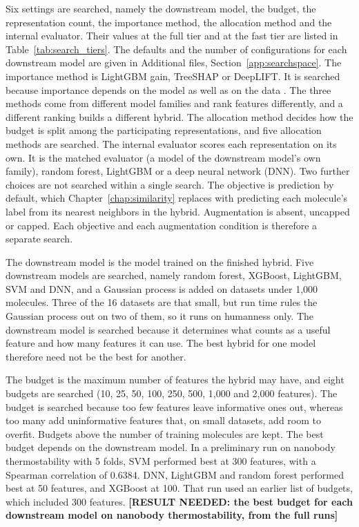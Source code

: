 Six settings are searched, namely the downstream model, the budget, the representation count, the importance method, the allocation method and the internal evaluator. Their values at the full tier and at the fast tier are listed in Table~\ref{tab:search_tiers}. The defaults and the number of configurations for each downstream model are given in Additional files, Section~\ref{app:searchspace}. The importance method is LightGBM gain, TreeSHAP or DeepLIFT. It is searched because importance depends on the model as well as on the data \citep{Dong2020}. The three methods come from different model families and rank features differently, and a different ranking builds a different hybrid. The allocation method decides how the budget is split among the participating representations, and five allocation methods are searched. The internal evaluator scores each representation on its own. It is the matched evaluator (a model of the downstream model's own family), random forest, LightGBM or a deep neural network (DNN). Two further choices are not searched within a single search. The objective is prediction by default, which Chapter~\ref{chap:similarity} replaces with predicting each molecule's label from its nearest neighbors in the hybrid. Augmentation is absent, uncapped or capped. Each objective and each augmentation condition is therefore a separate search.

The downstream model is the model trained on the finished hybrid. Five downstream models are searched, namely random forest, XGBoost, LightGBM, SVM and DNN, and a Gaussian process is added on datasets under 1,000 molecules. Three of the 16 datasets are that small, but run time rules the Gaussian process out on two of them, so it runs on humanness only. The downstream model is searched because it determines what counts as a useful feature and how many features it can use. The best hybrid for one model therefore need not be the best for another.

The budget is the maximum number of features the hybrid may have, and eight budgets are searched (10, 25, 50, 100, 250, 500, 1,000 and 2,000 features). The budget is searched because too few features leave informative ones out, whereas too many add uninformative features that, on small datasets, add room to overfit. Budgets above the number of training molecules are kept. The best budget depends on the downstream model. In a preliminary run on nanobody thermostability with 5 folds, SVM performed best at 300 features, with a Spearman correlation of 0.6384. DNN, LightGBM and random forest performed best at 50 features, and XGBoost at 100. That run used an earlier list of budgets, which included 300 features. \textbf{[RESULT NEEDED: the best budget for each downstream model on nanobody thermostability, from the full runs]}

